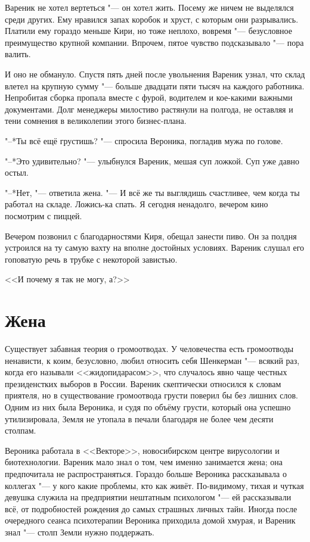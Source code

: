 Вареник не хотел вертеться "--- он хотел жить.
Посему же ничем не выделялся среди других.
Ему нравился запах коробок и хруст, с которым они разрывались.
Платили ему гораздо меньше Кири, но тоже неплохо, вовремя "--- безусловное преимущество крупной компании.
Впрочем, пятое чувство подсказывало "--- пора валить.

И оно не обмануло.
Спустя пять дней после увольнения Вареник узнал, что склад влетел на крупную сумму "--- больше двадцати пяти тысяч на каждого работника.
Непробитая сборка пропала вместе с фурой, водителем и кое-какими важными документами.
Долг менеджеры милостиво растянули на полгода, не оставляя и тени сомнения в великолепии этого бизнес-плана.

"--*Ты всё ещё грустишь? "--- спросила Вероника, погладив мужа по голове.

"--*Это удивительно? "--- улыбнулся Вареник, мешая суп ложкой.
Суп уже давно остыл.

"--*Нет, "--- ответила жена.
"--- И всё же ты выглядишь счастливее, чем когда ты работал на складе.
Ложись-ка спать.
Я сегодня ненадолго, вечером кино посмотрим с пиццей.

Вечером позвонил с благодарностями Киря, обещал занести пиво.
Он за полдня устроился на ту самую вахту на вполне достойных условиях.
Вареник слушал его гоповатую речь в трубке с некоторой завистью.

<<И почему я так не могу, а?>>

\section{\spacing}

\section{Жена}

Существует забавная теория о громоотводах.
У человечества есть громоотводы ненависти, к коим, безусловно, любил относить себя Шенкерман "--- всякий раз, когда его называли <<жидопидарасом>>, что случалось явно чаще честных президенстких выборов в России.
Вареник скептически относился к словам приятеля, но в существование громоотвода грусти поверил бы без лишних слов.
Одним из них была Вероника, и судя по объёму грусти, который она успешно утилизировала, Земля не утопала в печали благодаря не более чем десяти столпам.

Вероника работала в <<Векторе>>, новосибирском центре вирусологии и биотехнологии.
Вареник мало знал о том, чем именно занимается жена;
она предпочитала не распространяться.
Гораздо больше Вероника рассказывала о коллегах "--- у кого какие проблемы, кто как живёт.
По-видимому, тихая и чуткая девушка служила на предприятии нештатным психологом "--- ей рассказывали всё, от подробностей рождения до самых страшных личных тайн.
Иногда после очередного сеанса психотерапии Вероника приходила домой хмурая, и Вареник знал "--- столп Земли нужно поддержать.

